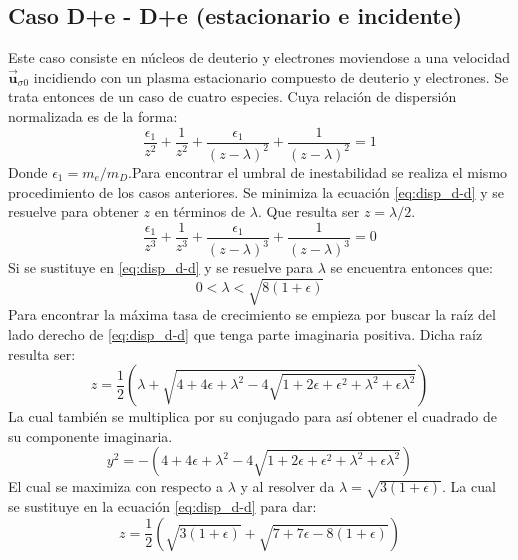 \documentclass[12pt]{article}
\begin{document}
\subsection*{Caso D+e - D+e (estacionario e incidente)}
Este caso consiste en núcleos de deuterio y electrones moviendose a una velocidad $\overrightarrow{\textbf{u}}_{\sigma 0}$ incidiendo con un plasma estacionario compuesto de deuterio y electrones. Se trata entonces de un caso de cuatro especies. Cuya relación de dispersión normalizada es de la forma:
\begin{equation}
\label{eq:disp_d-d}
\frac{\epsilon_1}{z^2}+\frac{1}{z^2}+\frac{\epsilon_1}{(z-\lambda)^2}+\frac{1}{(z-\lambda)^2}=1
\end{equation}
Donde $\epsilon_1 = m_e / m_D$.Para encontrar el umbral de inestabilidad se realiza el mismo procedimiento de los casos anteriores. Se minimiza la ecuación \ref{eq:disp_d-d} y se resuelve para obtener $z$ en términos de $\lambda$. Que resulta ser $z=\lambda /2$.
\begin{equation}
\frac{\epsilon_1}{z^3}+\frac{1}{z^3}+\frac{\epsilon_1}{(z-\lambda)^3}+\frac{1}{(z-\lambda)^3}=0
\end{equation}
Si se sustituye en \ref{eq:disp_d-d} y se resuelve para $\lambda$ se encuentra entonces que:
\begin{equation}
0 < \lambda < \sqrt{8(1+\epsilon)}
\end{equation}
Para encontrar la máxima tasa de crecimiento se empieza por buscar la raíz del lado derecho de \ref{eq:disp_d-d} que tenga parte imaginaria positiva. Dicha raíz resulta ser:
\begin{equation}
\label{eq:raiz_d-d}
z =\frac{1}{2}\left(\lambda + \sqrt{4 + 4\epsilon + \lambda ^2 -4\sqrt{1+2\epsilon + \epsilon^2+ \lambda^2 + \epsilon \lambda ^2}} \right)
\end{equation}
La cual también se multiplica por su conjugado para así obtener el cuadrado de su componente imaginaria.
\begin{equation}
y^2 = -\left(4 + 4\epsilon + \lambda ^2 -4\sqrt{1+2\epsilon + \epsilon^2+ \lambda^2 + \epsilon \lambda ^2}\right)
\end{equation}
El cual se maximiza con respecto a $\lambda$ y al resolver da $\lambda = \sqrt{3(1 + \epsilon)}$. La cual se sustituye en la ecuación \ref{eq:disp_d-d} para dar:
\begin{equation}
\label{eq:z-max-d-d}
z = \frac{1}{2}\left(\sqrt{3(1+\epsilon)} + \sqrt{7 + 7\epsilon -8(1+\epsilon)} \right)
\end{equation}
\end{document}
